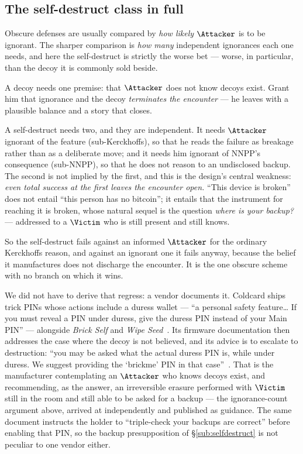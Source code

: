 \subsection{The self-destruct class in full}
\label{app:classify-selfdestruct}

\begin{remark}
\label{rem:two-ignorances}
Obscure defenses are usually compared by \emph{how likely} $\Attacker$ is to be
ignorant. The sharper comparison is \emph{how many} independent ignorances each
one needs, and here the self-destruct is strictly the worse bet --- worse, in
particular, than the decoy it is commonly sold beside.

A decoy needs one premise: that $\Attacker$ does not know decoys exist. Grant him
that ignorance and the decoy \emph{terminates the encounter} --- he leaves with a
plausible balance and a story that closes.

A self-destruct needs two, and they are independent. It needs $\Attacker$ ignorant
of the feature (sub-Kerckhoffs), so that he reads the failure as breakage rather
than as a deliberate move; and it needs him ignorant of NNPP's consequence
(sub-NNPP), so that he does not reason to an undisclosed backup. The second is
not implied by the first, and this is the design's central weakness: \emph{even
total success at the first leaves the encounter open.} ``This device is broken''
does not entail ``this person has no bitcoin''; it entails that the instrument
for reaching it is broken, whose natural sequel is the question \emph{where is
your backup?} --- addressed to a $\Victim$ who is still present and still knows.

So the self-destruct fails against an informed $\Attacker$ for the ordinary
Kerckhoffs reason, and against an ignorant one it fails anyway, because the
belief it manufactures does not discharge the encounter. It is the one obscure
scheme with no branch on which it wins.

We did not have to derive that regress: a vendor documents it. Coldcard ships
trick PINs whose actions include a duress wallet --- ``a personal safety
feature\ldots{} If you must reveal a PIN under duress, give the duress PIN
instead of your Main PIN'' --- alongside \emph{Brick Self} and \emph{Wipe
Seed}~\cite{coldcard-trick-pins}. Its firmware documentation then addresses the
case where the decoy is not believed, and its advice is to escalate to
destruction: ``you may be asked what the actual duress PIN is, while under
duress. We suggest providing the `brickme' PIN in that
case''~\cite{coldcard-pin-entry}. That is the manufacturer contemplating an
$\Attacker$ who knows decoys exist, and recommending, as the answer, an
irreversible erasure performed with $\Victim$ still in the room and still able
to be asked for a backup --- the ignorance-count argument above, arrived at
independently and published as guidance. The same document instructs the holder
to ``triple-check your backups are correct'' before enabling that PIN, so the
backup presupposition of \S\ref{sub:selfdestruct} is not peculiar to one vendor
either.
\end{remark}

